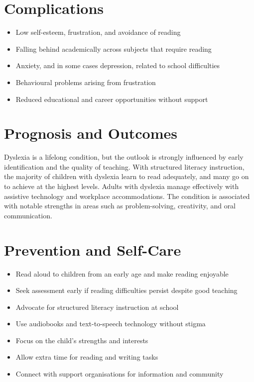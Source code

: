 \section*{Complications}
\begin{itemize}
    \item Low self-esteem, frustration, and avoidance of reading
    \item Falling behind academically across subjects that require reading
    \item Anxiety, and in some cases depression, related to school difficulties
    \item Behavioural problems arising from frustration
    \item Reduced educational and career opportunities without support
\end{itemize}

\section*{Prognosis and Outcomes}
Dyslexia is a lifelong condition, but the outlook is strongly influenced by early identification and the quality of teaching. With structured literacy instruction, the majority of children with dyslexia learn to read adequately, and many go on to achieve at the highest levels. Adults with dyslexia manage effectively with assistive technology and workplace accommodations. The condition is associated with notable strengths in areas such as problem-solving, creativity, and oral communication.

\section*{Prevention and Self-Care}
\begin{itemize}
    \item Read aloud to children from an early age and make reading enjoyable
    \item Seek assessment early if reading difficulties persist despite good teaching
    \item Advocate for structured literacy instruction at school
    \item Use audiobooks and text-to-speech technology without stigma
    \item Focus on the child's strengths and interests
    \item Allow extra time for reading and writing tasks
    \item Connect with support organisations for information and community
\end{itemize}

